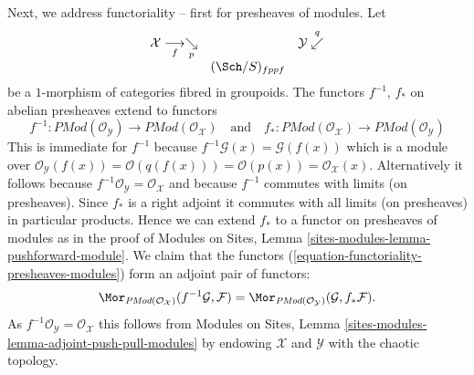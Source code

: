 \medskip\noindent
Next, we address functoriality -- first for presheaves of modules. Let
$$
\begin{array}{ccc}\mathcal{X} \underset{f}{\longrightarrow}\underset{p}{\searrow} &  & \mathcal{Y} \overset{q}{\swarrow} \\  & (\Sch/S)_{fppf} & \end{array}
$$
be a $1$-morphism of categories fibred in groupoids.
The functors $f^{-1}$, $f_*$ on abelian presheaves extend to functors
\begin{equation}
\label{equation-functoriality-presheaves-modules}
f^{-1} :
\textit{PMod}(\mathcal{O}_\mathcal{Y})
\longrightarrow
\textit{PMod}(\mathcal{O}_\mathcal{X})
\quad\text{and}\quad
f_* :
\textit{PMod}(\mathcal{O}_\mathcal{X})
\longrightarrow
\textit{PMod}(\mathcal{O}_\mathcal{Y})
\end{equation}
This is immediate for $f^{-1}$ because
$f^{-1}\mathcal{G}(x) = \mathcal{G}(f(x))$ which is a module over
$\mathcal{O}_\mathcal{Y}(f(x)) = \mathcal{O}(q(f(x))) = \mathcal{O}(p(x)) =
\mathcal{O}_\mathcal{X}(x)$. Alternatively it follows because
$f^{-1}\mathcal{O}_\mathcal{Y} = \mathcal{O}_\mathcal{X}$
and because $f^{-1}$ commutes with limits (on presheaves).
Since $f_*$ is a right adjoint it commutes with all limits
(on presheaves) in particular products. Hence we can extend
$f_*$ to a functor on presheaves of modules as in the proof of
Modules on Sites, Lemma \ref{sites-modules-lemma-pushforward-module}.
We claim that the functors (\ref{equation-functoriality-presheaves-modules})
form an adjoint pair of functors:
$$
\Mor_{\textit{PMod}(\mathcal{O}_\mathcal{X})}(
f^{-1}\mathcal{G}, \mathcal{F})
=
\Mor_{\textit{PMod}(\mathcal{O}_\mathcal{Y})}(
\mathcal{G}, f_*\mathcal{F}).
$$
As $f^{-1}\mathcal{O}_\mathcal{Y} = \mathcal{O}_\mathcal{X}$
this follows from
Modules on Sites, Lemma \ref{sites-modules-lemma-adjoint-push-pull-modules}
by endowing $\mathcal{X}$ and $\mathcal{Y}$ with the chaotic
topology.


